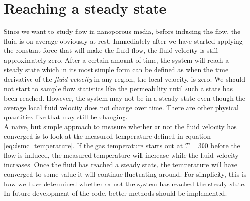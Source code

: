 \section{Reaching a steady state}
\label{sec:dsmc_steady_state}
Since we want to study flow in nanoporous media, before inducing the flow, the fluid is on average obviously at rest. Immediately after we have started applying the constant force that will make the fluid flow, the fluid velocity is still approximately zero. After a certain amount of time, the system will reach a steady state which in its most simple form can be defined as when the time derivative of the \textit{fluid velocity} in any region, the local velocity, is zero. We should not start to sample flow statistics like the permeability until such a state has been reached. However, the system may not be in a steady state even though the average local fluid velocity does not change over time. There are other physical quantities like that may still be changing.\\
A naive, but simple approach to measure whether or not the fluid velocity has converged is to look at the measured temperature defined in equation \eqref{eq:dsmc_temperature}. If the gas temperature starts out at $T=$\unit{300}{\kelvin} before the flow is induced, the measured temperature will increase while the fluid velocity increases. Once the fluid has reached a steady state, the temperature will have converged to some value it will continue fluctuating around. For simplicity, this is how we have determined whether or not the system has reached the steady state. In future development of the code, better methods should be implemented.